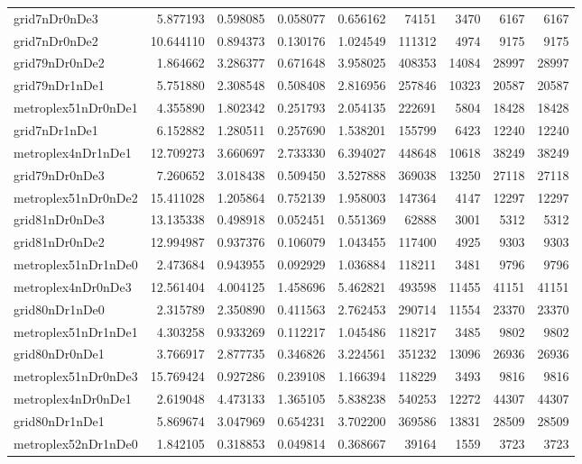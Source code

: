 \documentclass[../../../thesis.tex]{subfiles}
\begin{document}
\begin{longtable}{|l|r|r|r|r|r|r|r|r|}
grid7nDr0nDe3 & 5.877193 & 0.598085 & 0.058077 & 0.656162 & 74151 & 3470 & 6167 & 6167 \\
grid7nDr0nDe2 & 10.644110 & 0.894373 & 0.130176 & 1.024549 & 111312 & 4974 & 9175 & 9175 \\
grid79nDr0nDe2 & 1.864662 & 3.286377 & 0.671648 & 3.958025 & 408353 & 14084 & 28997 & 28997 \\
grid79nDr1nDe1 & 5.751880 & 2.308548 & 0.508408 & 2.816956 & 257846 & 10323 & 20587 & 20587 \\
metroplex51nDr0nDe1 & 4.355890 & 1.802342 & 0.251793 & 2.054135 & 222691 & 5804 & 18428 & 18428 \\
grid7nDr1nDe1 & 6.152882 & 1.280511 & 0.257690 & 1.538201 & 155799 & 6423 & 12240 & 12240 \\
metroplex4nDr1nDe1 & 12.709273 & 3.660697 & 2.733330 & 6.394027 & 448648 & 10618 & 38249 & 38249 \\
grid79nDr0nDe3 & 7.260652 & 3.018438 & 0.509450 & 3.527888 & 369038 & 13250 & 27118 & 27118 \\
metroplex51nDr0nDe2 & 15.411028 & 1.205864 & 0.752139 & 1.958003 & 147364 & 4147 & 12297 & 12297 \\
grid81nDr0nDe3 & 13.135338 & 0.498918 & 0.052451 & 0.551369 & 62888 & 3001 & 5312 & 5312 \\
grid81nDr0nDe2 & 12.994987 & 0.937376 & 0.106079 & 1.043455 & 117400 & 4925 & 9303 & 9303 \\
metroplex51nDr1nDe0 & 2.473684 & 0.943955 & 0.092929 & 1.036884 & 118211 & 3481 & 9796 & 9796 \\
metroplex4nDr0nDe3 & 12.561404 & 4.004125 & 1.458696 & 5.462821 & 493598 & 11455 & 41151 & 41151 \\
grid80nDr1nDe0 & 2.315789 & 2.350890 & 0.411563 & 2.762453 & 290714 & 11554 & 23370 & 23370 \\
metroplex51nDr1nDe1 & 4.303258 & 0.933269 & 0.112217 & 1.045486 & 118217 & 3485 & 9802 & 9802 \\
grid80nDr0nDe1 & 3.766917 & 2.877735 & 0.346826 & 3.224561 & 351232 & 13096 & 26936 & 26936 \\
metroplex51nDr0nDe3 & 15.769424 & 0.927286 & 0.239108 & 1.166394 & 118229 & 3493 & 9816 & 9816 \\
metroplex4nDr0nDe1 & 2.619048 & 4.473133 & 1.365105 & 5.838238 & 540253 & 12272 & 44307 & 44307 \\
grid80nDr1nDe1 & 5.869674 & 3.047969 & 0.654231 & 3.702200 & 369586 & 13831 & 28509 & 28509 \\
metroplex52nDr1nDe0 & 1.842105 & 0.318853 & 0.049814 & 0.368667 & 39164 & 1559 & 3723 & 3723 \\

\end{longtable}
\end{document}
